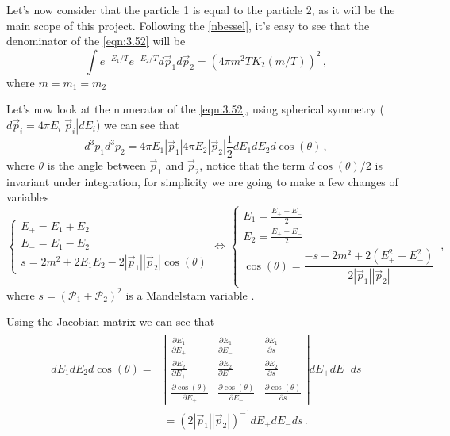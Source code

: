 Let's now consider that the particle 1 is equal to the particle 2, as it will be the main scope of this project.
Following the \autoref{nbessel}, it's easy to see that the denominator of the \autoref{eqn:3.52} will be
\begin{equation}
	\label{3.53}
	\int e^{-E_1/T}e^{-E_2/T}d\vec{p}_1d\vec{p}_2=(4\pi m^2 T K_2(m/T))^2\,,
\end{equation}
where $m=m_1=m_2$

Let's now look at the numerator of the \autoref{eqn:3.52}, using spherical symmetry ($d\vec{p}_i=4\pi E_i |\vec{p}_i| dE_i$) we can see that
\begin{equation}
	\label{volume1}
	d^3p_1d^3p_2=4\pi E_1 |\vec{p}_1| 4\pi E_2 |\vec{p}_2|  \frac{1}{2}dE_1dE_2d\cos(\theta)\,,
\end{equation}
where $\theta$ is the angle between $\vec{p}_1$ and $\vec{p}_2$, notice that the term $d\cos(\theta)/2$ is invariant under integration, for simplicity we are going to make a few changes of variables
\begin{equation}
	\left\{\begin{array}{l}
			E_+=E_1+E_2 \\
			E_-=E_1-E_2 \\
			s=2m^2+2E_1E_2-2|\vec{p}_1||\vec{p}_2|\cos(\theta)
	\end{array} \right.	\Leftrightarrow
	\left\{\begin{array}{l}
		E_1=\frac{E_++E_-}{2} \\
		E_2=\frac{E_+-E_-}{2} \\
		\cos(\theta)=\dfrac{-s+2m^2+2(E_+^2-E_-^2)}{2|\vec{p}_1||\vec{p}_2|}
	\end{array} \right.\,,
\end{equation}
where $s=\left(\mathcal{P}_1+\mathcal{P}_2\right)^2$ is a Mandelstam variable \cite{otto}.

Using the Jacobian matrix we can see that
\begin{align}
	\begin{array}{ll}
		dE_1dE_2d\cos(\theta)
		=&\left| 
		\begin{array}{lll} 
			\frac{\partial E_1}{\partial E_+} & \frac{\partial E_1}{\partial E_-} & \frac{\partial E_1}{\partial s}\\
			\frac{\partial E_2}{\partial E_+} & \frac{\partial E_2}{\partial E_-} & \frac{\partial E_2}{\partial s}\\
			\frac{\partial \cos(\theta)}{\partial E_+} & \frac{\partial \cos(\theta)}{\partial E_-} & \frac{\partial \cos(\theta)}{\partial s}
		\end{array} \right|dE_+dE_-ds \\ [15pt]
	&= (2|\vec{p}_1||\vec{p}_2|)^{-1}dE_+dE_-ds\,.
	\end{array}
\end{align}


